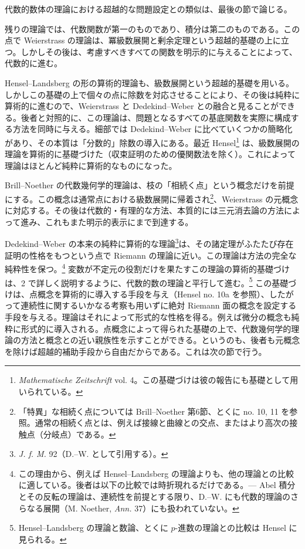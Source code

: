 \documentclass[11pt]{article}
\begin{document}
代数的数体の理論における超越的な問題設定との類似は、最後の節で論じる。

残りの理論では、代数関数が第一のものであり、積分は第二のものである。この点で Weierstrass の理論は、冪級数展開と剰余定理という超越的基礎の上に立つ。しかしその後は、考慮すべきすべての関数を明示的に与えることによって、代数的に進む。

Hensel--Landsberg の形の算術的理論も、級数展開という超越的基礎を用いる。しかしこの基礎の上で個々の点に除数を対応させることにより、その後は純粋に算術的に進むので、Weierstrass と Dedekind--Weber との融合と見ることができる。後者と対照的に、この理論は、問題となるすべての基底関数を実際に構成する方法を同時に与える。細部では Dedekind--Weber に比べていくつかの簡略化があり、その本質は「分数的」除数の導入にある。最近 Hensel\footnote{\emph{Mathematische Zeitschrift} vol. 4。この基礎づけは彼の報告にも基礎として用いられている。} は、級数展開の理論を算術的に基礎づけた（収束証明のための優関数法を除く）。これによって理論はほとんど純粋に算術的なものになった。

Brill--Noether の代数幾何学的理論は、枝の「相続く点」という概念だけを前提にする。この概念は通常点における級数展開に帰着され\footnote{「特異」な相続く点については Brill--Noether 第6節、とくに no. 10, 11 を参照。通常の相続く点とは、例えば接線と曲線との交点、またはより高次の接触点（分岐点）である。}、Weierstrass の元概念に対応する。その後は代数的・有理的な方法、本質的には三元消去論の方法によって進み、これもまた明示的表示にまで到達する。

Dedekind--Weber の本来の純粋に算術的な理論\footnote{\emph{J. f. M.} 92（D.--W. として引用する）。}は、その諸定理がふたたび存在証明の性格をもつという点で Riemann の理論に近い。この理論は方法の完全な純粋性を保つ。\footnote{この理由から、例えば Hensel--Landsberg の理論よりも、他の理論との比較に適している。後者は以下の比較では時折現れるだけである。--- Abel 積分とその反転の理論は、連続性を前提とする限り、D.--W. にも代数的理論のさらなる展開（M. Noether, \emph{Ann.} 37）にも扱われていない。} 変数が不定元の役割だけを果たすこの理論の算術的基礎づけは、2 で詳しく説明するように、代数的数の理論と平行して進む。\footnote{Hensel--Landsberg の理論と数論、とくに \(p\)-進数の理論との比較は Hensel に見られる。} この基礎づけは、点概念を算術的に導入する手段を与え（Hensel no. 10a を参照）、したがって連続性に関するいかなる考察も用いずに絶対 Riemann 面の概念を設定する手段を与える。理論はそれによって形式的な性格を得る。例えば微分の概念も純粋に形式的に導入される。点概念によって得られた基礎の上で、代数幾何学的理論の方法と概念との近い親族性を示すことができる。というのも、後者も元概念を除けば超越的補助手段から自由だからである。これは次の節で行う。
\end{document}
